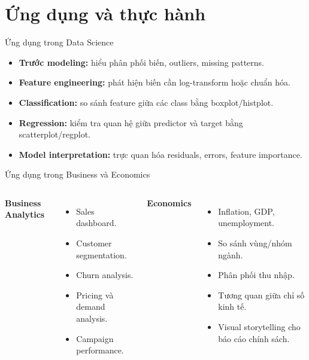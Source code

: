 \documentclass[aspectratio=169,11pt]{beamer}
\begin{document}
\section{Ứng dụng và thực hành}

\begin{frame}{Ứng dụng trong Data Science}
\begin{itemize}
    \item \textbf{Trước modeling:} hiểu phân phối biến, outliers, missing patterns.
    \item \textbf{Feature engineering:} phát hiện biến cần log-transform hoặc chuẩn hóa.
    \item \textbf{Classification:} so sánh feature giữa các class bằng boxplot/histplot.
    \item \textbf{Regression:} kiểm tra quan hệ giữa predictor và target bằng scatterplot/regplot.
    \item \textbf{Model interpretation:} trực quan hóa residuals, errors, feature importance.
\end{itemize}
\end{frame}

\begin{frame}{Ứng dụng trong Business và Economics}
\begin{columns}[T,onlytextwidth]
\textbf{Business Analytics}
\begin{itemize}
    \item Sales dashboard.
    \item Customer segmentation.
    \item Churn analysis.
    \item Pricing và demand analysis.
    \item Campaign performance.
\end{itemize}

\textbf{Economics}
\begin{itemize}
    \item Inflation, GDP, unemployment.
    \item So sánh vùng/nhóm ngành.
    \item Phân phối thu nhập.
    \item Tương quan giữa chỉ số kinh tế.
    \item Visual storytelling cho báo cáo chính sách.
\end{itemize}
\end{columns}
\end{frame}
\end{document}
